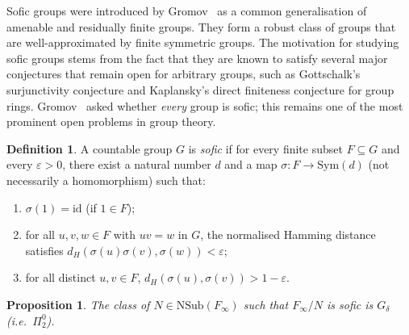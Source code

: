 \documentclass[12pt,fleqn,a4paper]{amsart}
\numberwithin{equation}{section}
\newtheorem{proposition}[theorem]{Proposition}
\theoremstyle{definition}
\newtheorem{definition}[theorem]{Definition}
\newcommand{\NSub}{\mathrm{NSub}}
\begin{document}
Sofic groups were introduced by Gromov~\cite{Gromov1999} as a common generalisation of amenable
and residually finite groups.  They form a robust class of groups that are
well-approximated by finite symmetric groups.  The motivation for studying sofic groups
stems from the fact that they are known to satisfy several major conjectures that remain
open for arbitrary groups, such as Gottschalk's surjunctivity conjecture and
Kaplansky's direct finiteness conjecture for group rings.  Gromov~\cite{Gromov1999}
asked whether \emph{every} group is sofic; this remains one of the most prominent open
problems in group theory.

\begin{definition}\label{def:sofic}
A countable group $G$ is \emph{sofic} if for every finite subset $F\subseteq G$ and
every $\varepsilon>0$, there exist a natural number $d$ and a map
$\sigma:F\to\mathrm{Sym}(d)$ (not necessarily a homomorphism) such that:
\begin{enumerate}
\item $\sigma(1)=\mathrm{id}$ (if $1\in F$);
\item for all $u,v,w\in F$ with $uv=w$ in $G$, the normalised Hamming distance
satisfies $d_H(\sigma(u)\sigma(v),\sigma(w))<\varepsilon$;
\item for all distinct $u,v\in F$,
$d_H(\sigma(u),\sigma(v))>1-\varepsilon$.
\end{enumerate}
\end{definition}

\begin{proposition}\label{prop:sofic}
The class of $N\in\NSub(F_\infty)$ such that $F_\infty/N$ is sofic is $G_\delta$
(\emph{i.e.}~$\Pi^0_2$).
\end{proposition}
\end{document}

